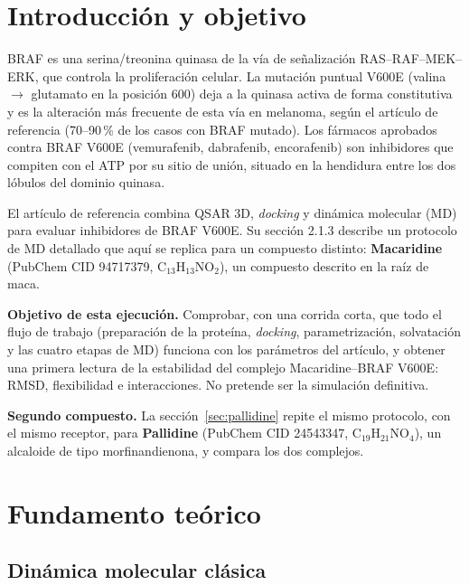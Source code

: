 \documentclass[11pt,a4paper]{article}
\begin{document}
\newpage

\section{Introducción y objetivo}

BRAF es una serina/treonina quinasa de la vía de señalización RAS--RAF--MEK--ERK, que controla la
proliferación celular. La mutación puntual V600E (valina $\rightarrow$ glutamato en la posición 600)
deja a la quinasa activa de forma constitutiva y es la alteración más frecuente de esta vía en
melanoma, según el artículo de referencia (70--90\,\% de los casos con BRAF mutado). Los fármacos
aprobados contra BRAF V600E (vemurafenib, dabrafenib, encorafenib) son inhibidores que compiten con el
ATP por su sitio de unión, situado en la hendidura entre los dos lóbulos del dominio quinasa.

El artículo de referencia \cite{singh2022} combina QSAR 3D, \textit{docking} y dinámica molecular (MD)
para evaluar inhibidores de BRAF V600E. Su sección 2.1.3 describe un protocolo de MD detallado que aquí
se replica para un compuesto distinto: \textbf{Macaridine} (PubChem CID 94717379, C$_{13}$H$_{13}$NO$_2$),
un compuesto descrito en la raíz de maca.

\textbf{Objetivo de esta ejecución.} Comprobar, con una corrida corta, que todo el flujo de trabajo
(preparación de la proteína, \textit{docking}, parametrización, solvatación y las cuatro etapas de MD)
funciona con los parámetros del artículo, y obtener una primera lectura de la estabilidad del complejo
Macaridine--BRAF V600E: RMSD, flexibilidad e interacciones. No pretende ser la simulación definitiva.

\textbf{Segundo compuesto.} La sección~\ref{sec:pallidine} repite el mismo protocolo, con el mismo
receptor, para \textbf{Pallidine} (PubChem CID 24543347, C$_{19}$H$_{21}$NO$_4$), un alcaloide de tipo
morfinandienona, y compara los dos complejos.

\section{Fundamento teórico}

\subsection{Dinámica molecular clásica}
\end{document}
